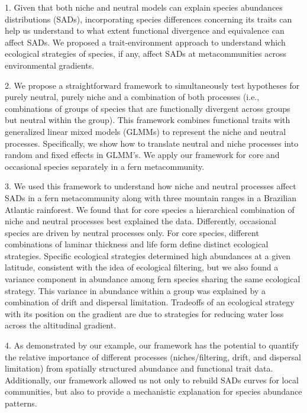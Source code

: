 \documentclass[12pt]{article}
\begin{document}

1. Given that both niche and neutral models can explain species abundances distributions (SADs), incorporating species differences concerning its traits can help us understand to what extent functional divergence and equivalence can affect SADs. We proposed a trait-environment approach to understand which ecological strategies of species, if any, affect SADs at metacommunities across environmental gradients. 

2. We propose a straightforward framework to simultaneously test hypotheses for purely neutral, purely niche and a combination of both processes (i.e., combinations of groups of species that are functionally divergent across groups but neutral within the group). This framework combines functional traits with generalized linear mixed models (GLMMs) to represent the niche and neutral processes. Specifically, we show how to translate neutral and niche processes into random and fixed effects in GLMM's. We apply our framework for core and occasional species separately in a fern metacommunity. %

3. We used this framework to understand how niche and neutral processes affect SADs in a fern metacommunity along with three mountain ranges in a Brazilian Atlantic rainforest. We found that for core species a hierarchical combination of niche and neutral processes best explained the data. Differently, occasional species are driven by neutral processes only. %
For core species, different combinations of laminar thickness and life form define distinct ecological strategies. Specific ecological strategies determined high abundances at a given latitude, consistent with the idea of ecological filtering, but we also found a variance component in abundance among fern species sharing the same ecological strategy. This variance in abundance within a group was explained by a combination of drift and dispersal limitation. Tradeoffs of an ecological strategy with its position on the gradient are due to strategies for reducing water loss across the altitudinal gradient.

4. As demonstrated by our example, our framework has the potential to quantify the relative importance of different processes (niches/filtering, drift, and dispersal limitation) from spatially structured abundance and functional trait data. Additionally, our framework allowed us not only to rebuild SADs curves for local communities, but also to provide a mechanistic explanation for species abundance patterns. 
\end{document}
